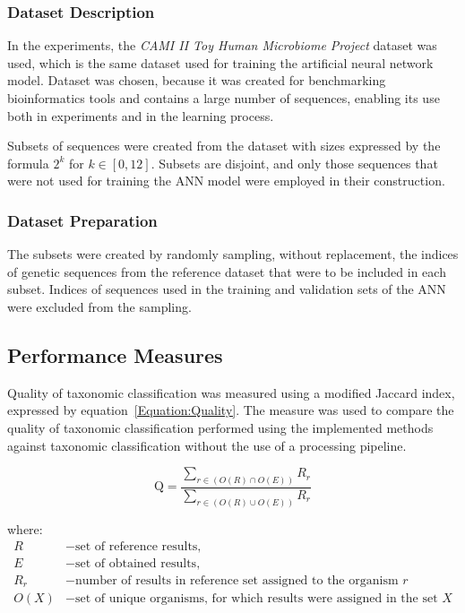 \documentclass[pdflatex,sn-vancouver-num]{sn-jnl}%
\begin{document}
            \subsubsection{Dataset Description}
                In the experiments, the \textit{CAMI II Toy Human Microbiome Project}\cite{Fritz:2019} dataset was used, which is the same dataset used for training the artificial neural network model. Dataset was chosen, because it was created for benchmarking bioinformatics tools and contains a large number of sequences, enabling its use both in experiments and in the learning process.

                Subsets of sequences were created from the dataset with sizes expressed by the formula $2^k$ for $k \in [0, 12]$. Subsets are disjoint, and only those sequences that were not used for training the ANN model were employed in their construction.

            \subsubsection{Dataset Preparation}
                The subsets were created by randomly sampling, without replacement, the indices of genetic sequences from the reference dataset that were to be included in each subset. Indices of sequences used in the training and validation sets of the ANN were excluded from the sampling. 

        \subsection{Performance Measures}
            Quality of taxonomic classification was measured using a modified Jaccard index, expressed by equation~\ref{Equation:Quality}. The measure was used to compare the quality of taxonomic classification performed using the implemented methods against taxonomic classification without the use of a processing pipeline.

            \begin{equation}
                \text{Q} = \frac{
                    \sum_{r \in (O(R) \cap O(E))} R_{r}
                }{
                    \sum_{r \in (O(R) \cup O(E))} R_{r}
                }
                \label{Equation:Quality}
            \end{equation}

            where:
            \begin{align*}
                R &- \text{set of reference results,} \\
                E &- \text{set of obtained results,} \\
                R_{r} &- \text{number of results in reference set assigned to the organism $r$} \\
                O(X) &- \text{set of unique organisms, for which results were assigned in the set $X$}
            \end{align*}
\end{document}
